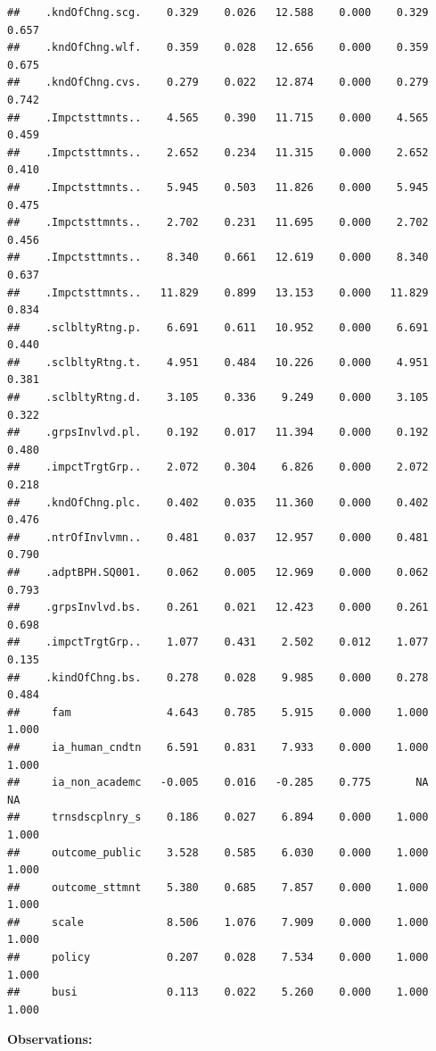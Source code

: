 \documentclass[
]{article}
\begin{document}
\begin{verbatim}
##    .kndOfChng.scg.    0.329    0.026   12.588    0.000    0.329    0.657
##    .kndOfChng.wlf.    0.359    0.028   12.656    0.000    0.359    0.675
##    .kndOfChng.cvs.    0.279    0.022   12.874    0.000    0.279    0.742
##    .Impctsttmnts..    4.565    0.390   11.715    0.000    4.565    0.459
##    .Impctsttmnts..    2.652    0.234   11.315    0.000    2.652    0.410
##    .Impctsttmnts..    5.945    0.503   11.826    0.000    5.945    0.475
##    .Impctsttmnts..    2.702    0.231   11.695    0.000    2.702    0.456
##    .Impctsttmnts..    8.340    0.661   12.619    0.000    8.340    0.637
##    .Impctsttmnts..   11.829    0.899   13.153    0.000   11.829    0.834
##    .sclbltyRtng.p.    6.691    0.611   10.952    0.000    6.691    0.440
##    .sclbltyRtng.t.    4.951    0.484   10.226    0.000    4.951    0.381
##    .sclbltyRtng.d.    3.105    0.336    9.249    0.000    3.105    0.322
##    .grpsInvlvd.pl.    0.192    0.017   11.394    0.000    0.192    0.480
##    .impctTrgtGrp..    2.072    0.304    6.826    0.000    2.072    0.218
##    .kndOfChng.plc.    0.402    0.035   11.360    0.000    0.402    0.476
##    .ntrOfInvlvmn..    0.481    0.037   12.957    0.000    0.481    0.790
##    .adptBPH.SQ001.    0.062    0.005   12.969    0.000    0.062    0.793
##    .grpsInvlvd.bs.    0.261    0.021   12.423    0.000    0.261    0.698
##    .impctTrgtGrp..    1.077    0.431    2.502    0.012    1.077    0.135
##    .kindOfChng.bs.    0.278    0.028    9.985    0.000    0.278    0.484
##     fam               4.643    0.785    5.915    0.000    1.000    1.000
##     ia_human_cndtn    6.591    0.831    7.933    0.000    1.000    1.000
##     ia_non_academc   -0.005    0.016   -0.285    0.775       NA       NA
##     trnsdscplnry_s    0.186    0.027    6.894    0.000    1.000    1.000
##     outcome_public    3.528    0.585    6.030    0.000    1.000    1.000
##     outcome_sttmnt    5.380    0.685    7.857    0.000    1.000    1.000
##     scale             8.506    1.076    7.909    0.000    1.000    1.000
##     policy            0.207    0.028    7.534    0.000    1.000    1.000
##     busi              0.113    0.022    5.260    0.000    1.000    1.000
\end{verbatim}

\textbf{Observations:}
\end{document}
